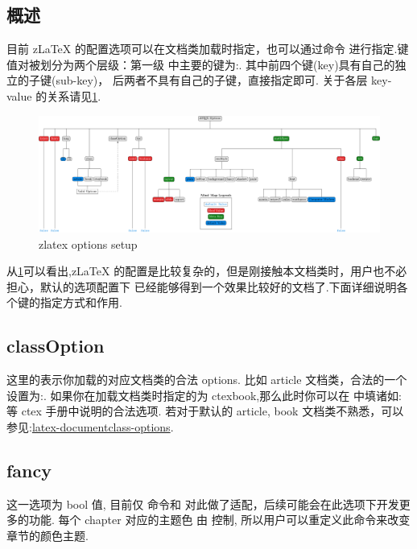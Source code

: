 \subsection{概述}
目前 z\LaTeX{} 的配置选项可以在文档类加载时指定，也可以通过命令 \cmd{\zlatexSetup}进行指定.键值对被划分为两个层级：第一级
中主要的键为:. 其中前四个键(key)具有自己的独立的子键(sub-key)，
后两者不具有自己的子键，直接指定即可. 关于各层 key-value 的关系请见\cref{fig:zlatex-options}.

\begin{figure}[!htb]
    \centering
    \includegraphics[width=1\linewidth]{./pics/zlatex_options.pdf}
    \caption{zlatex options setup}
    \label{fig:zlatex-options}
\end{figure}

从\cref{fig:zlatex-options}可以看出,z\LaTeX{} 的配置是比较复杂的，但是刚接触本文档类时，用户也不必担心，默认的选项配置下
已经能够得到一个效果比较好的文档了.下面详细说明各个键的指定方式和作用. 

\subsection{classOption}
这里的表示你加载的对应文档类的合法 options. 比如 {article} 文档类，合法的一个设置为:. 如果你在加载文档类时指定的为 {ctexbook},那么此时你可以在
中填诸如: 等 {ctex} 手册中说明的合法选项. 若对于默认的 article,
book 文档类不熟悉，可以参见:\href{https://texblog.org/2013/02/13/latex-documentclass-options-illustrated/}{latex-documentclass-options}.

\subsection{fancy}
这一选项为 bool 值, 目前仅 \cmd[F]{\chapter} 命令和  对此做了适配，后续可能会在此选项下开发更多的功能. 
每个 chapter 对应的主题色
由  控制, 所以用户可以重定义此命令来改变章节的颜色主题.

